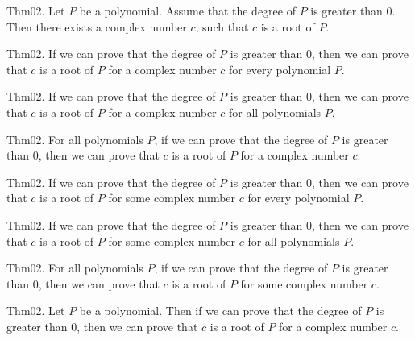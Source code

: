 \documentclass{article}
\begin{document}
Thm02. Let $P$ be a polynomial. Assume that the degree of $P$ is greater than $0$. Then there exists a complex number $c$, such that $c$ is a root of $P$.

Thm02. If we can prove that the degree of $P$ is greater than $0$, then we can prove that $c$ is a root of $P$ for a complex number $c$ for every polynomial $P$.

Thm02. If we can prove that the degree of $P$ is greater than $0$, then we can prove that $c$ is a root of $P$ for a complex number $c$ for all polynomials $P$.

Thm02. For all polynomials $P$, if we can prove that the degree of $P$ is greater than $0$, then we can prove that $c$ is a root of $P$ for a complex number $c$.

Thm02. If we can prove that the degree of $P$ is greater than $0$, then we can prove that $c$ is a root of $P$ for some complex number $c$ for every polynomial $P$.

Thm02. If we can prove that the degree of $P$ is greater than $0$, then we can prove that $c$ is a root of $P$ for some complex number $c$ for all polynomials $P$.

Thm02. For all polynomials $P$, if we can prove that the degree of $P$ is greater than $0$, then we can prove that $c$ is a root of $P$ for some complex number $c$.

Thm02. Let $P$ be a polynomial. Then if we can prove that the degree of $P$ is greater than $0$, then we can prove that $c$ is a root of $P$ for a complex number $c$.
\end{document}
